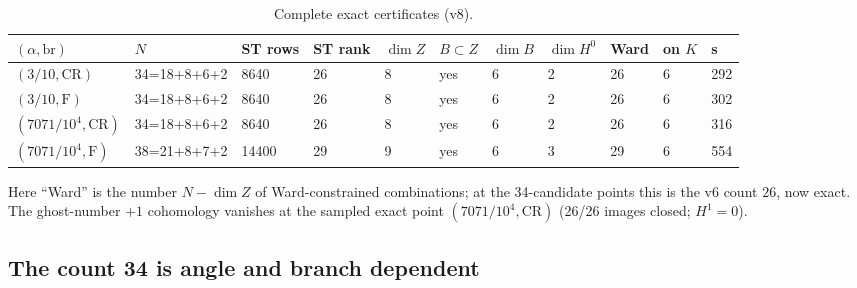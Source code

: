 \documentclass[11pt,a4paper]{article}
\newcommand{\Fr}{\mathrm F}
\newcommand{\CR}{\mathrm{CR}}
\theoremstyle{plain}
\theoremstyle{definition}
\theoremstyle{remark}
\numberwithin{equation}{section}
\begin{document}
\begin{center}
\scriptsize
\begin{longtable}{@{}lllllllllll@{}}
\caption{Complete exact certificates (v8).}\label{tab:v8cert}\\
\toprule
\((\alpha,\text{br})\) & \(N\) & ST rows & ST rank & \(\dim Z\) & \(B\subset Z\) & \(\dim B\) & \(\dim H^0\) & Ward & on \(K\) & s\\
\midrule
\((3/10,\CR)\) & 34=18+8+6+2 & 8640 & 26 & 8 & yes & 6 & 2 & 26 & 6 & 292\\
\((3/10,\Fr)\) & 34=18+8+6+2 & 8640 & 26 & 8 & yes & 6 & 2 & 26 & 6 & 302\\
\((7071/10^4,\CR)\) & 34=18+8+6+2 & 8640 & 26 & 8 & yes & 6 & 2 & 26 & 6 & 316\\
\((7071/10^4,\Fr)\) & 38=21+8+7+2 & 14400 & 29 & 9 & yes & 6 & 3 & 29 & 6 & 554\\
\bottomrule
\end{longtable}
\end{center}

Here ``Ward'' is the number \(N-\dim Z\) of Ward-constrained
combinations; at the 34-candidate points this is the v6 count
\(26\), now exact. The ghost-number \(+1\) cohomology vanishes at
the sampled exact point \((7071/10^4,\CR)\) (26/26 images closed;
\(H^1=0\)).

\subsection{The count 34 is angle and branch dependent}
\end{document}
